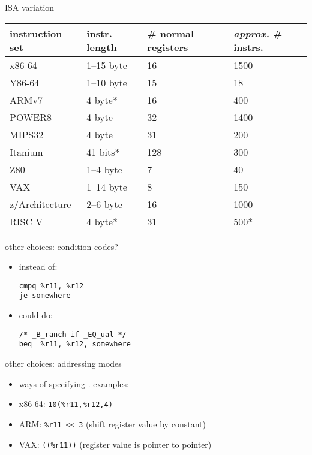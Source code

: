 \begin{frame}[label=ISAVariants]{ISA variation}
    \begin{tabular}{l|p{2cm}p{2cm}p{2cm}}
    instruction set & instr. length & \# normal registers & \emph{approx.} \# instrs. \\ \hline
    x86-64 & 1--15 byte & 16 & 1500 \\
    Y86-64 & 1--10 byte & 15 & 18 \\
    ARMv7 & 4 byte* &16 & 400 \\
    POWER8 & 4 byte &  32 & 1400 \\
    MIPS32 & 4 byte &  31 & 200 \\
    Itanium & 41 bits* & 128 & 300 \\
    Z80 & 1--4 byte & 7 & 40 \\
    VAX & 1--14 byte & 8 & 150 \\
    z/Architecture & 2--6 byte  & 16 & 1000 \\
    RISC V & 4 byte*  & 31 & 500* \\
    \end{tabular}
\end{frame}

\begin{frame}[label=ISAChoices,fragile]{other choices: condition codes?}
    \begin{itemize}
        \item instead of:
\begin{lstlisting}
cmpq %r11, %r12
je somewhere
\end{lstlisting}
        \item could do:
\begin{lstlisting}
/* _B_ranch if _EQ_ual */
beq  %r11, %r12, somewhere
\end{lstlisting}
    \end{itemize}
\end{frame}

\begin{frame}[label=ISAChoicesAddrModes,fragile]{other choices: addressing modes}
    \begin{itemize}
        \item ways of specifying . examples:
        \item x86-64: \lstinline|10(%r11,%r12,4)|
        \item ARM: \lstinline|%r11 << 3| {\small (shift register value by constant)}
        \item VAX: \lstinline|((%r11))| {\small (register value is pointer to pointer)}
    \end{itemize}
\end{frame}

